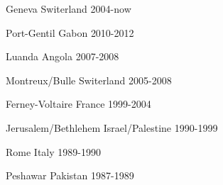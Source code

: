 


\begin{cvhonors}


\cvhonor
{Geneva} %
{Switerland} %
{} %
{2004-now} %
 
 
\cvhonor
{Port-Gentil} %
{Gabon} %
{} %
{2010-2012} %



\cvhonor
{Luanda} %
{Angola} %
{} %
{2007-2008} %


\cvhonor
{Montreux/Bulle} %
{Switerland} %
{} %
{2005-2008} %



\cvhonor
{Ferney-Voltaire} %
{France} %
{} %
{1999-2004} %



\cvhonor
{Jerusalem/Bethlehem} %
{Israel/Palestine} %
{} %
{1990-1999} %

    

\cvhonor
{Rome} %
{Italy} %
{} %
{1989-1990} %



\cvhonor
{Peshawar} %
{Pakistan} %
{} %
{1987-1989} %


\end{cvhonors}